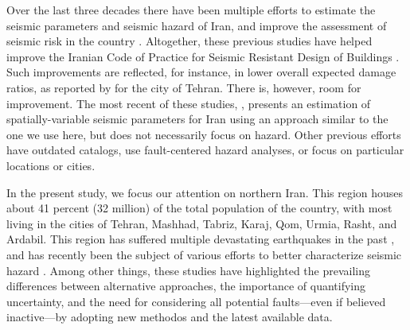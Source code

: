 Over the last three decades there have been multiple efforts to estimate the seismic parameters and seismic hazard of Iran, and improve the assessment of seismic risk in the country \citep[e.g.,][]{Tavakoli1999, Moinfar_2000_Chap, Ghodrati2003, Moinfar_2012_WCEE, Khodaverdian_2016_BSSA}. Altogether, these previous studies have helped improve the Iranian Code of Practice for Seismic Resistant Design of Buildings \citep{BHRC2014}. Such improvements are reflected, for instance, in lower overall expected damage ratios, as reported by \citet{Ghodrati2013} for the city of Tehran. There is, however, room for improvement. The most recent of these studies, \citet{Khodaverdian_2016_BSSA}, presents an estimation of spatially-variable seismic parameters for Iran using an approach similar to the one we use here, but does not necessarily focus on hazard. Other previous efforts have outdated catalogs, use fault-centered hazard analyses, or focus on particular locations or cities.

In the present study, we focus our attention on northern Iran. This region houses about 41 percent (32 million) of the total population of the country, with most living in the cities of Tehran, Mashhad, Tabriz, Karaj, Qom, Urmia, Rasht, and Ardabil. This region has suffered multiple devastating earthquakes in the past \citep[e.g.,][]{Mehrain_1990_Tech, Chafory-Ashtiany_1999_DPM, Razzaghi_2012_Tech}, and has recently been the subject of various efforts to better characterize seismic hazard \citep[e.g.,][]{Abdollahzadeh2014a, Boostan2015}. Among other things, these studies have highlighted the prevailing differences between alternative approaches, the importance of quantifying uncertainty, and the need for considering all potential faults---even if believed inactive---by adopting new methodos and the latest available data.


